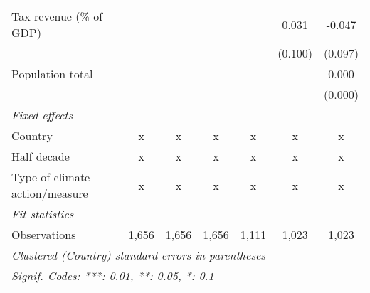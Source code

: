 \begin{tabular}{lcccccc}
   Tax revenue (\% of GDP)                           &         &         &                &               & 0.031         & -0.047\\   
                                                     &         &         &                &               & (0.100)       & (0.097)\\   
   Population total                                  &         &         &                &               &               & 0.000\\   
                                                     &         &         &                &               &               & (0.000)\\   
   \emph{Fixed effects}\\
   Country                                           & x       & x       & x              & x             & x             & x\\  
   Half decade                                       & x       & x       & x              & x             & x             & x\\  
   Type of climate action/measure                    & x       & x       & x              & x             & x             & x\\  
   \midrule \emph{Fit statistics}\\
   Observations                                      & 1,656   & 1,656   & 1,656          & 1,111         & 1,023         & 1,023\\  
   \midrule
   \multicolumn{7}{l}{\emph{Clustered (Country) standard-errors in parentheses}}\\
   \multicolumn{7}{l}{\emph{Signif. Codes: ***: 0.01, **: 0.05, *: 0.1}}\\
\end{tabular}
\par\endgroup


